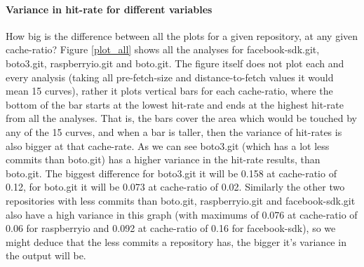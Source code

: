 \documentclass[12pt,twoside,notitlepage]{report}
\begin{document}
\paragraph{Variance in hit-rate for different variables}How big is the difference between all the plots for a given repository, at any given cache-ratio?  Figure \ref{plot_all} shows all the analyses for facebook-sdk.git, boto3.git, raspberryio.git and boto.git. The figure itself does not plot each and every analysis (taking all pre-fetch-size and distance-to-fetch values it would mean 15 curves), rather it plots vertical bars for each cache-ratio, where the bottom of the bar starts at the lowest hit-rate and ends at the highest hit-rate from all the analyses. That is, the bars cover the area which would be touched by any of the 15 curves, and when a bar is taller, then the variance of hit-rates is also bigger at that cache-rate. As we can see boto3.git (which has a lot less commits than boto.git) has a higher variance in the hit-rate results, than boto.git. The biggest difference for boto3.git it will be 0.158 at cache-ratio of 0.12, for boto.git it will be 0.073 at cache-ratio of 0.02. Similarly the other two repositories with less commits than boto.git, raspberryio.git and facebook-sdk.git also have a high variance in this graph (with maximums of 0.076 at cache-ratio of 0.06 for raspberryio and 0.092 at cache-ratio of 0.16 for facebook-sdk), so we might deduce that the less commits a repository has, the bigger it's variance in the output will be.
\end{document}
